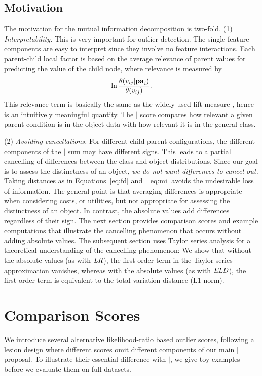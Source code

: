 {\subsection{Motivation} 

The motivation for the mutual information decomposition is two-fold. 
(1) {\em Interpretability.} This is very important for outlier detection. The single-feature components are easy to interpret since they involve no feature interactions. Each parent-child local factor is based on the average relevance of parent values for predicting the value of the child node, where relevance is measured by $$\ln \frac{\theta(v_{ij}|\mathbf{pa}_{i})}{\theta(v_{ij})}.$$ This relevance term  is basically the same as the widely used lift measure \citep{Tuffery2011}, hence is an intuitively meaningful quantity. The $\mid$ score compares how relevant a given parent condition is in the object data with how relevant it is in the general class. 


(2) {\em Avoiding cancellations.} 
For different child-parent configurations, the different components of the $\mid$ sum may have different signs. This leads to a partial cancelling of differences between the class and object distributions. Since our goal is to assess the distinctness of an object, {\em we do not want differences to cancel out.} Taking distances as in Equations~\eqref{eq:fd} and ~\eqref{eq:mi} avoids the undesirable loss of information. The general point is that averaging differences is appropriate when considering costs, or utilities, but not appropriate for assessing the distinctness of an object. In contrast, the absolute values add differences regardless of their sign. The next section provides comparison scores and example computations that illustrate the cancelling phenomenon that occurs without adding absolute values. The subsequent section uses Taylor series analysis for a theoretical understanding of the cancelling phenomenon: We show that without the absolute values (as with $\it{LR}$), the first-order term in the Taylor series approximation vanishes, whereas with the absolute values (as with $\it{ELD}$), the first-order term is equivalent to the total variation distance (L1 norm). 

\section{Comparison Scores} \label{sec:metrics}

We introduce several alternative likelihood-ratio based outlier scores, following a lesion design where different scores omit different components of our main $\mid$ proposal. %
To illustrate their essential difference with $\mid$, we give toy examples before we evaluate them on full datasets.

}
